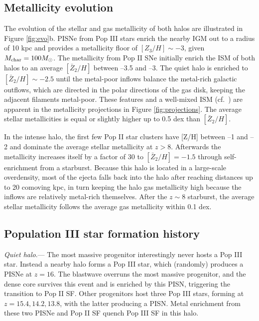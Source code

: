 \documentclass[12pt]{article}
\newcommand{\Ms}{\ifmmode{M_\odot}\else{$M_\odot$}\fi}
\begin{document}
\subsection*{Metallicity evolution}

The evolution of the stellar and gas metallicity of both halos are
illustrated in Figure \ref{fig:evo}b.  PISNe from Pop III stars enrich
the nearby IGM out to a radius of 10 kpc and provides a metallicity
floor of $[Z_3/H] \sim -3$, given $M_{\rm char} = 100 \Ms$.  The
metallicity from Pop II SNe initially enrich the ISM of both halos to
an average $[\bar{Z}_2/H]$ between --3.5 and --3.  The quiet halo is
enriched to $[\bar{Z}_2/H] \sim -2.5$ until the metal-poor inflows
balance the metal-rich galactic outflows, which are directed in the
polar directions of the gas disk, keeping the adjacent filaments
metal-poor.  These features and a well-mixed ISM
(cf.~\cite{Wise08_Gal, Greif10}) are apparent in the metallicity
projections in Figure \ref{fig:projections}.  The average stellar
metallicities is equal or slightly higher up to 0.5 dex than
$[\bar{Z}_2/H]$.

In the intense halo, the first few Pop II star clusters have [Z/H]
between --1 and --2 and dominate the average stellar metallicity at $z
> 8$.  Afterwards the metallicity increases itself by a factor of 30
to $[\bar{Z}_2/H] = -1.5$ through self-enrichment from a starburst.
Because this halo is located in a large-scale overdensity, most of the
ejecta falls back into the halo after reaching distances up to 20
comoving kpc, in turn keeping the halo gas metallicity high because
the inflows are relatively metal-rich themselves.  After the $z \sim
8$ starburst, the average stellar metallicity follows the average gas
metallicity within 0.1 dex.

\subsection*{Population III star formation history}

\textit{Quiet halo}.--- The most massive progenitor interestingly
never hosts a Pop III star.  Instead a nearby halo forms a Pop III
star, which (randomly) produces a PISNe at $z=16$.  The blastwave
overruns the most massive progenitor, and the dense core survives this
event and is enriched by this PISN, triggering the transition to Pop
II SF.  Other progenitors host three Pop III stars, forming at $z =
15.4, 14.2, 13.8$, with the latter producing a PISN.  Metal enrichment
from these two PISNe and Pop II SF quench Pop III SF in this halo.
\end{document}
